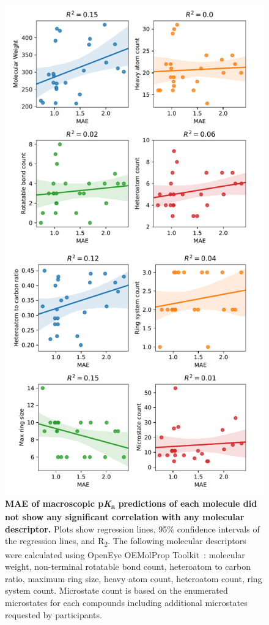 \documentclass[9pt,lineno,final]{elife}
\newcommand{\pKa}{p\textit{K}\textsubscript{a}}
\begin{document}
\begin{figure}
\centering
\includegraphics[width=0.5\linewidth]{figures/molecular_properties_vs_MAE_correlation_fig.pdf}
\caption{ {\bf MAE of macroscopic \pKa{} predictions of each molecule did not show any significant correlation with any molecular descriptor.} Plots show regression lines, 95\% confidence intervals of the regression lines, and R\textsubscript{2}. The following molecular descriptors were calculated using OpenEye OEMolProp Toolkit~\citep{oemolprop_openeye_2017}: molecular weight, non-terminal rotatable bond count, heteroatom to carbon ratio, maximum ring size, heavy atom count, heteroatom count, ring system count. Microstate count is based on the enumerated microstates for each compounds including additional microstates requested by participants.
}
\label{fig:molecular_properties_vs_MAE_correlation}
\end{figure}
\end{document}
